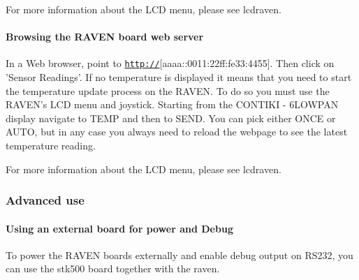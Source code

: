  \-For more information about the \-L\-C\-D menu, please see lcdraven.\hypertarget{a00058_running_browse}{}\paragraph{\-Browsing the R\-A\-V\-E\-N board web server}\label{a00058_running_browse}
\-In a \-Web browser, point to \href{http://}{\tt http\-://}\mbox{[}aaaa\-:\-:0011\-:22ff\-:fe33\-:4455\mbox{]}. \-Then click on '\-Sensor \-Readings'. \-If no temperature is displayed it means that you need to start the temperature update process on the \-R\-A\-V\-E\-N. \-To do so you must use the \-R\-A\-V\-E\-N's \-L\-C\-D menu and joystick. \-Starting from the \-C\-O\-N\-T\-I\-K\-I -\/ 6\-L\-O\-W\-P\-A\-N display navigate to \-T\-E\-M\-P and then to \-S\-E\-N\-D. \-You can pick either \-O\-N\-C\-E or \-A\-U\-T\-O, but in any case you always need to reload the webpage to see the latest temperature reading. \par
 \-For more information about the \-L\-C\-D menu, please see lcdraven.



 \hypertarget{a00058_advanced}{}\subsubsection{\-Advanced use}\label{a00058_advanced}
\hypertarget{a00058_advanced_externalboard}{}\paragraph{\-Using an external board for power and Debug}\label{a00058_advanced_externalboard}
\-To power the \-R\-A\-V\-E\-N boards externally and enable debug output on \-R\-S232, you can use the stk500 board together with the raven.

